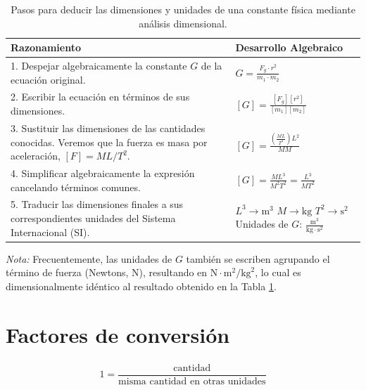 \documentclass[11pt,a4paper]{book}
\renewcommand{\arraystretch}{1.9}
\begin{document}
\begin{table}[H]
\centering
\renewcommand{\arraystretch}{1.5}
\begin{tabular}{|p{}|p{}|}
\hline
\textbf{Razonamiento} & \textbf{Desarrollo Algebraico} \\
\hline
1. Despejar algebraicamente la constante $G$ de la ecuación original. & 
$\displaystyle G = \frac{F_g \cdot r^2}{m_1 \cdot m_2}$ \\
\hline
2. Escribir la ecuación en términos de sus dimensiones. & 
$\displaystyle [G] = \frac{[F_g] [r^2]}{[m_1] [m_2]}$ \\
\hline
3. Sustituir las dimensiones de las cantidades conocidas. Veremos que la fuerza es masa por aceleración, $[F] = \unit{ML}/\unit{T^2}$. & 
$\displaystyle [G] = \frac{\left( \frac{\unit{ML}}{\unit{T^2}} \right) \unit{L^2}}{\unit{MM}}$ \\
\hline
4. Simplificar algebraicamente la expresión cancelando términos comunes. & 
$\displaystyle[G] = \frac{\unit{ML^3}}{\unit{M^2 T^2}} = \frac{\unit{L^3}}{\unit{MT^2}}$ \\
\hline
5. Traducir las dimensiones finales a sus correspondientes unidades del Sistema Internacional (SI). & 
$\unit{L^3} \rightarrow \text{m}^3$ \newline
$\unit{M} \rightarrow \text{kg}$ \newline
$\unit{T^2} \rightarrow \text{s}^2$ \newline
Unidades de $G$: $\displaystyle \frac{\text{m}^3}{\text{kg} \cdot \text{s}^2}$ \\
\hline
\end{tabular}
\caption{Pasos para deducir las dimensiones y unidades de una constante física mediante análisis dimensional.}
\label{tab:analisis_dimensional_G}
\end{table}

\textit{Nota:} Frecuentemente, las unidades de $G$ también se escriben agrupando el término de fuerza (Newtons, $\text{N}$), resultando en $\text{N}\cdot\text{m}^2/\text{kg}^2$, lo cual es dimensionalmente idéntico al resultado obtenido en la Tabla \ref{tab:analisis_dimensional_G}.


\section{Factores de conversión}

\begin{align*}
    1 = \dfrac{\text{cantidad}}{\text{misma cantidad en otras unidades}}
\end{align*}
\end{document}
